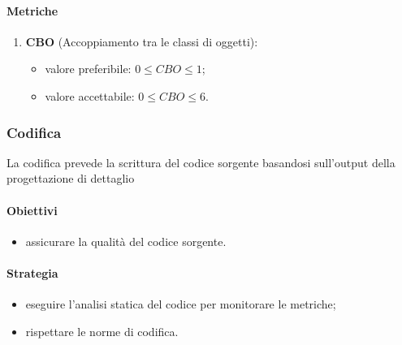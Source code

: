         \paragraph{Metriche}
            \begin{enumerate}
                \item \textbf{CBO} (Accoppiamento tra le classi di oggetti):
                \begin{itemize}
                    \item valore preferibile: $0 \leq CBO\leq 1$;
                    \item valore accettabile: $0 \leq CBO\leq 6$.
                \end{itemize}
            \end{enumerate}
    \subsubsection{Codifica}
        La codifica prevede la scrittura del codice sorgente basandosi sull'output della progettazione di dettaglio
        \paragraph{Obiettivi}
            \begin{itemize}
                \item assicurare la qualità del codice sorgente.
            \end{itemize}
        \paragraph{Strategia}
            \begin{itemize}
                \item eseguire l'analisi statica del codice per monitorare le metriche;
                \item rispettare le norme di codifica.
            \end{itemize}

